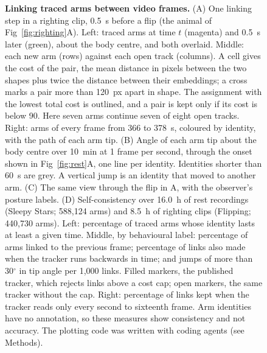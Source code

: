 \begin{figure}[!ht]
\caption{{\bf Linking traced arms between video frames.}
(A) One linking step in a righting clip, 0.5~s before a flip (the animal of Fig~\ref{fig:righting}A). Left: traced arms at time $t$ (magenta) and 0.5~s later (green), about the body centre, and both overlaid. Middle: each new arm (rows) against each open track (columns). A cell gives the cost of the pair, the mean distance in pixels between the two shapes plus twice the distance between their embeddings; a cross marks a pair more than 120~px apart in shape. The assignment with the lowest total cost is outlined, and a pair is kept only if its cost is below 90. Here seven arms continue seven of eight open tracks. Right: arms of every frame from 366 to 378~s, coloured by identity, with the path of each arm tip.
(B) Angle of each arm tip about the body centre over 10~min at 1 frame per second, through the onset shown in Fig~\ref{fig:rest}A, one line per identity. Identities shorter than 60~s are grey. A vertical jump is an identity that moved to another arm.
(C) The same view through the flip in A, with the observer's posture labels.
(D) Self-consistency over 16.0~h of rest recordings (Sleepy Stars; 588,124 arms) and 8.5~h of righting clips (Flipping; 440,730 arms). Left: percentage of traced arms whose identity lasts at least a given time. Middle, by behavioural label: percentage of arms linked to the previous frame; percentage of links also made when the tracker runs backwards in time; and jumps of more than 30$^{\circ}$ in tip angle per 1,000 links. Filled markers, the published tracker, which rejects links above a cost cap; open markers, the same tracker without the cap. Right: percentage of links kept when the tracker reads only every second to sixteenth frame. Arm identities have no annotation, so these measures show consistency and not accuracy. The plotting code was written with coding agents (see Methods).}
\label{fig:identity}
\end{figure}
